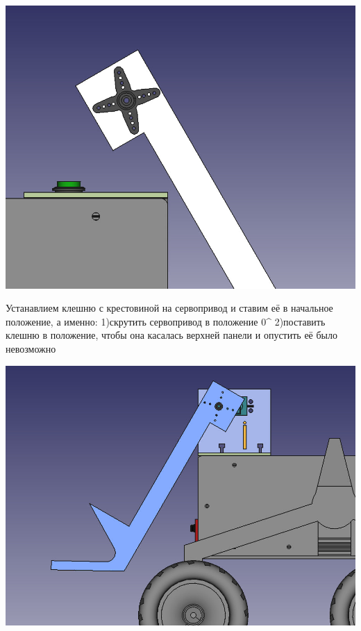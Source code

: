 \documentclass[12pt,a4paper,oneside]{article}
\begin{document}
\includegraphics[width=\textwidth]{servo.png}

Устанавлием клешню с крестовиной на сервопривод и ставим её в начальное положение, а именно:
1)скрутить сервопривод в положение 0^{\circ}
2)поставить клешню в положение, чтобы она касалась верхней панели и опустить её было невозможно

\includegraphics[width=\textwidth]{full_claw.png}
\end{document}

